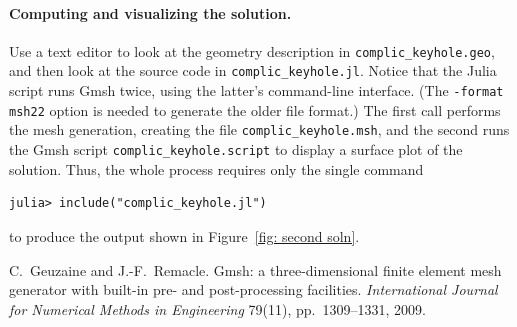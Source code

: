 \documentclass[a4paper,12pt]{article}
\begin{document}
\paragraph{Computing and visualizing the solution.}  
Use a text editor to look at the geometry description 
in \verb!complic_keyhole.geo!, and then look at the source code in
\verb!complic_keyhole.jl!.  Notice that the Julia script runs Gmsh 
twice, using the latter's command-line interface.  (The 
\verb!-format msh22! option is needed to generate the older file format.)
The first call performs the mesh generation, creating the file 
\verb!complic_keyhole.msh!, and the second runs the Gmsh 
script \verb!complic_keyhole.script! to display a surface plot of the 
solution.  Thus, the whole process requires only the single command
\begin{verbatim}
julia> include("complic_keyhole.jl")
\end{verbatim}
to produce the output shown in Figure~\ref{fig: second soln}.
\begin{thebibliography}{0}
C.~Geuzaine and J.-F.~Remacle. Gmsh: a three-dimensional finite 
element mesh generator with built-in pre- and post-processing 
facilities. \emph{International Journal for Numerical Methods in 
Engineering} 79(11), pp.~1309--1331, 2009.
\end{thebibliography}
\end{document}
